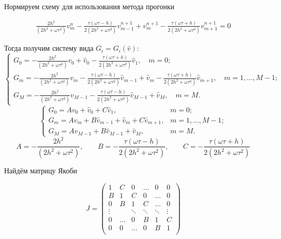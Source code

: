 Нормируем схему для использования метода прогонки

\begin{align}
\boxed{
\frac{2h^2 }{\left(2h^2 + \omega \tau^2\right)}v_m^n -
\frac{\tau\left(\omega \tau -h \right)}{2\left(2h^2 + \omega \tau^2\right) } v_{m-1}^{n+1} +
v_{m}^{n+1} -
\frac{\tau \left( \omega \tau + h \right)}{2\left(2h^2 + \omega \tau^2\right) } v_{m+1}^{n+1}= 0
}
\end{align}

Тогда получим систему вида $G_i = G_i(\hat{v})$:
\[
\begin{cases}
G_0 = -
\frac{2h^2 }{\left(2h^2 + \omega \tau^2\right)} v_0 +
\hat{v}_0 -
\frac{\tau \left( \omega \tau + h \right)}{2\left(2h^2 + \omega \tau^2\right) } \hat{v}_1, \quad m = 0;\\
G_m = 
-\frac{2h^2 }{\left(2h^2 + \omega \tau^2\right)}v_m -
\frac{\tau\left(\omega \tau -h \right)}{2\left(2h^2 + \omega \tau^2\right) } \hat{v}_{m-1} +
\hat{v}_{m} -
\frac{\tau \left( \omega \tau + h \right)}{2\left(2h^2 + \omega \tau^2\right) } \hat{v}_{m+1}, \quad m = 1,\dots, M - 1;\\
G_M = -
\frac{2h^2 }{\left(2h^2 + \omega \tau^2\right)}v_{M-1} -
\frac{\tau\left(\omega \tau -h \right)}{2\left(2h^2 + \omega \tau^2\right) } \hat{v}_{M-1} +
\hat{v}_{M}, \quad m = M.
\end{cases}
\]
\[
\begin{cases}
G_0 = A v_0 +
\hat{v}_0 +
C \hat{v}_1, & m = 0;\\
G_m = 
A v_m +
B \hat{v}_{m-1} +
\hat{v}_{m}+
C \hat{v}_{m+1}, & m = 1,\dots, M - 1;\\
G_M = 
A v_{M-1} +
B \hat{v}_{M-1} +
\hat{v}_{M}, & m = M.
\end{cases}
\]
\[
A = - \frac{2h^2 }{\left(2h^2 + \omega \tau^2\right)}, \qquad B = -\frac{\tau\left(\omega \tau -h \right)}{2\left(2h^2 + \omega \tau^2\right) }, \qquad  C = -\frac{\tau\left(\omega \tau +h \right)}{2\left(2h^2 + \omega \tau^2\right)}
\]


Найдём матрицу Якоби

\[
J =  \begin{pmatrix}
        1 & C & 0 &\dots & 0 & 0 \\
        B & 1 & C & 0 & \dots & 0 \\
        0 & B & 1 & C & \dots & 0 \\
		\vdots& & \ddots&\ddots &\ddots & \vdots \\
        0 &  \dots & 0 & B & 1 & C \\
        0 & 0 & \dots & 0 & B & 1\\
    \end{pmatrix}
\]